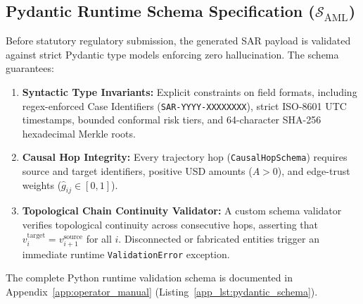 \subsection{\texorpdfstring{Pydantic Runtime Schema Specification ($\mathcal{S}_{\text{AML}}$)}{Pydantic Runtime Schema Specification (S\_AML)}}
Before statutory regulatory submission, the generated SAR payload is validated against strict Pydantic type models enforcing zero hallucination. The schema guarantees:
\begin{enumerate}
    \item \textbf{Syntactic Type Invariants:} Explicit constraints on field formats, including regex-enforced Case Identifiers (\texttt{SAR-YYYY-XXXXXXXX}), strict ISO-8601 UTC timestamps, bounded conformal risk tiers, and 64-character SHA-256 hexadecimal Merkle roots.
    \item \textbf{Causal Hop Integrity:} Every trajectory hop (\texttt{CausalHopSchema}) requires source and target identifiers, positive USD amounts ($A > 0$), and edge-trust weights ($\hat{g}_{ij} \in [0, 1]$).
    \item \textbf{Topological Chain Continuity Validator:} A custom schema validator verifies topological continuity across consecutive hops, asserting that $v_i^{\text{target}} = v_{i+1}^{\text{source}}$ for all $i$. Disconnected or fabricated entities trigger an immediate runtime \texttt{ValidationError} exception.
\end{enumerate}
The complete Python runtime validation schema is documented in Appendix~\ref{app:operator_manual} (Listing~\ref{app_lst:pydantic_schema}).

